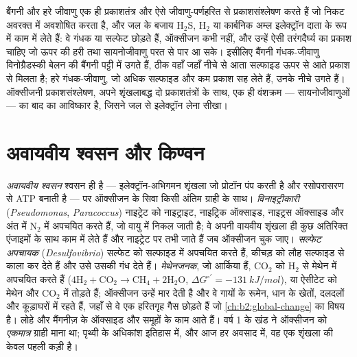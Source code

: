 \begin{definition}[अनॉक्सीजनी प्रकाशसंश्लेषण]\label{def:b2:microbial-metabolism:anoxygenic}
बैंगनी और हरे जीवाणु एक ही प्रकाशतंत्र और ऐसे जीवाणु-पर्णहरित से
प्रकाशसंश्लेषण करते हैं जो निकट अवरक्त में अवशोषित करता है, और जल के
बजाय $\mathrm{H_2S}$, $\mathrm{H_2}$ या कार्बनिक अम्ल इलेक्ट्रॉन दाता
के रूप में काम में लेते हैं: वे गंधक या सल्फेट छोड़ते हैं, ऑक्सीजन कभी
नहीं, और उन्हें ऐसी तरंगदैर्घ्य का प्रकाश चाहिए जो ऊपर की हरी तथा
सायनोजीवाणु परत से पार आ सके। इसीलिए बैंगनी गंधक-जीवाणु विनोग्रैडस्की
बेलन की बैंगनी पट्टी में उगते हैं, ठीक वहाँ जहाँ नीचे से आता सल्फाइड
ऊपर से आते प्रकाश से मिलता है; हरे गंधक-जीवाणु, जो अधिक सल्फाइड और कम
प्रकाश सह लेते हैं, उनके नीचे उगते हैं। ऑक्सीजनी प्रकाशसंश्लेषण, अपने
शृंखलाबद्ध दो प्रकाशतंत्रों के साथ, एक ही वंशक्रम --- सायनोजीवाणुओं ---
का बाद का आविष्कार है, जिसने जल से इलेक्ट्रॉन लेना सीखा।
\end{definition}

\section{अवायवीय श्वसन और किण्वन}

\begin{definition}[अवायवीय श्वसन]\label{def:b2:microbial-metabolism:anaerobic}
\emph{अवायवीय श्वसन} श्वसन ही है --- इलेक्ट्रॉन-अभिगमन शृंखला जो
प्रोटॉन पंप करती है और रसोपरासरण से ATP बनाती है --- पर ऑक्सीजन के
सिवा किसी अंतिम ग्राही के साथ। \emph{विनाइट्रीकारी}
(\emph{Pseudomonas}, \emph{Paracoccus}) नाइट्रेट को नाइट्राइट, नाइट्रिक
ऑक्साइड, नाइट्रस ऑक्साइड और अंत में $\mathrm{N_2}$ में अपचयित करते हैं,
जो वायु में निकल जाती है; वे अपनी वायवीय शृंखला ही कुछ अतिरिक्त एंजाइमों
के साथ काम में लेते हैं और नाइट्रेट पर तभी जाते हैं जब ऑक्सीजन चुक
जाए। \emph{सल्फेट अपचायक} (\emph{Desulfovibrio}) सल्फेट को सल्फाइड में
अपचयित करते हैं, कीचड़ को लौह सल्फाइड से काला कर देते हैं और उसे उसकी
गंध देते हैं। \emph{मेथेनजनक}, जो आर्किया हैं, $\mathrm{CO_2}$ को
$\mathrm{H_2}$ से मेथेन में अपचयित करते हैं ($4\mathrm{H_2} + \mathrm{CO_2} \to \mathrm{CH_4} +
2\mathrm{H_2O}$, $\Delta G^{\circ\prime} = \qty{-131}{kJ/mol}$), या
ऐसीटेट को मेथेन और $\mathrm{CO_2}$ में तोड़ते हैं; ऑक्सीजन उन्हें मार
देती है और वे गायों के रूमेन, धान के खेतों, दलदलों और कूड़ाघरों में
रहते हैं, जहाँ से वे एक हरितगृह गैस छोड़ते हैं जो
\cref{ch:b2:global-change} का विषय है। लोहे और मैंगनीज़ के ऑक्साइड और
समूहों के काम आते हैं। वर्ष 1 के खंड ने ऑक्सीजन को \emph{एकमात्र} ग्राही
माना था; पृथ्वी के अधिकांश इतिहास में, और आज हर अवसाद में, वह एक
शृंखला की केवल पहली कड़ी है।
\end{definition}

